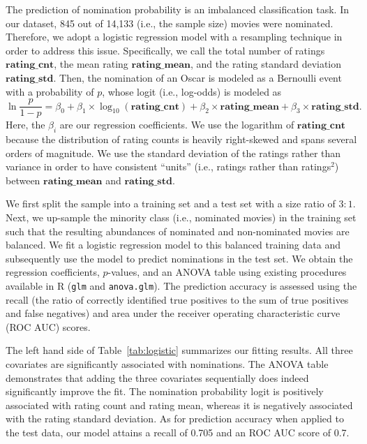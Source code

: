 \documentclass[dvipsnames]{article}
\begin{document}
The prediction of nomination probability is an imbalanced classification task. In our dataset, 845 out of 14,133 (i.e., the sample size) movies were nominated. Therefore, we adopt a logistic regression model with a resampling technique in order to address this issue. Specifically, we call the total number of ratings $\mathbf{rating}\_\mathbf{cnt}$, the mean rating $\mathbf{rating}\_\mathbf{mean}$, and the rating standard deviation $\mathbf{rating}\_\mathbf{std}$. Then, the nomination of an Oscar is modeled as a Bernoulli event with a probability of $p$, whose logit (i.e., log-odds) is modeled as
%
\begin{equation}
    \ln \frac{p}{1-p} = \beta_0 + \beta_1 \times \log_{10}(\mathbf{rating}\_\mathbf{cnt}) + \beta_2 \times \mathbf{rating}\_\mathbf{mean} + \beta_3 \times \mathbf{rating}\_\mathbf{std} .
\end{equation}
%
Here, the $\beta_i$ are our regression coefficients. We use the logarithm of $\mathbf{rating}\_\mathbf{cnt}$ because the distribution of rating counts is heavily right-skewed and spans several orders of magnitude. We use the standard deviation of the ratings rather than variance in order to have consistent ``units'' (i.e., ratings rather than ratings$^2$) between $\mathbf{rating}\_\mathbf{mean}$ and $\mathbf{rating}\_\mathbf{std}$.

We first split the sample into a training set and a test set with a size ratio of $3:1$. Next, we up-sample the minority class (i.e., nominated movies) in the training set such that the resulting abundances of nominated and non-nominated movies are balanced. We fit a logistic regression model to this balanced training data and subsequently use the model to predict nominations in the test set. We obtain the regression coefficients, $p$-values, and an ANOVA table using existing procedures available in R (\texttt{glm} and \texttt{anova.glm}). The prediction accuracy is assessed using the recall (the ratio of correctly identified true positives to the sum of true positives and false negatives) and area under the receiver operating characteristic curve (ROC AUC) scores. 

The left hand side of Table~\ref{tab:logistic} summarizes our fitting results. All three covariates are significantly associated with nominations. The ANOVA table demonstrates that adding the three covariates sequentially does indeed significantly improve the fit. The nomination probability logit is positively associated with rating count and rating mean, whereas it is negatively associated with the rating standard deviation. As for prediction accuracy when applied to the test data, our model attains a recall of 0.705 and an ROC AUC score of 0.7.
\end{document}
